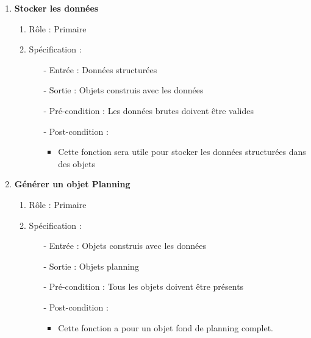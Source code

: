 \documentclass{polytech/polytech}
\begin{document}
\begin{enumerate}
		\item \textbf{Stocker les données}
		\begin{enumerate}
			\item Rôle :  Primaire
			\item Spécification :
			\begin{itemize}
				\item[-] Entrée : Données structurées
				\item[-] Sortie : Objets construis avec les données
				\item[-] Pré-condition : Les données brutes doivent être valides
				\item[-] Post-condition :
				\begin{itemize}[label=\textbullet, font=\LARGE]
					\item Cette fonction sera utile pour stocker les données structurées dans des objets
				\end{itemize}
			\end{itemize}
		\end{enumerate}

		\item \textbf{Générer un objet Planning}
		\begin{enumerate}
			\item Rôle :  Primaire
			\item Spécification :
			\begin{itemize}
				\item[-] Entrée : Objets construis avec les données
				\item[-] Sortie : Objets planning
				\item[-] Pré-condition : Tous les objets doivent être présents
				\item[-] Post-condition : 
				\begin{itemize}[label=\textbullet, font=\LARGE]
					\item Cette fonction a pour un objet fond de planning complet.
				\end{itemize}
			\end{itemize}
		\end{enumerate}


\end{enumerate}
\end{document}
